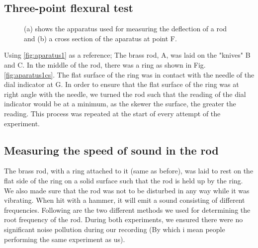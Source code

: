 \documentclass[11pt,a4paper]{article}
\begin{document}
  \subsection{Three-point flexural test}

    \begin{figure}[H]
      \centering
      \center
      \caption{(a) shows the apparatus used for measuring the deflection of a rod and (b) a cross section of the  aparatus at point F.}
      \label{fig:exp_1}
    \end{figure}

    Using \ref{fig:aparatus1} as a reference; The brass rod, A, was laid on the "knives" B and C. In the middle of the rod, there was a ring as shown in Fig. \ref{fig:aparatus1cs}. The flat surface of the ring was in contact with the needle of the dial indicator at G. In order to ensure that the flat surface of the ring was at right angle with the needle, we turned the rod such that the reading of the dial indicator would be at a minimum, as the skewer the surface, the greater the reading. This process was repeated at the start of every attempt of the experiment.
    
  \subsection{Measuring the speed of sound in the rod}
      The brass rod, with a ring attached to it (same as before), was laid to rest on the flat side of the ring on a solid surface such that the rod is held up by the ring. We also made sure that the rod was not to be disturbed in any way while it was vibrating. When hit with a hammer, it will emit a sound consisting of different frequencies. Following are the two different methods we used for determining the root frequency of the rod.
      During both experiments, we ensured there were no significant noise pollution during our recording (By which i mean people performing the same experiment as us).
\end{document}
